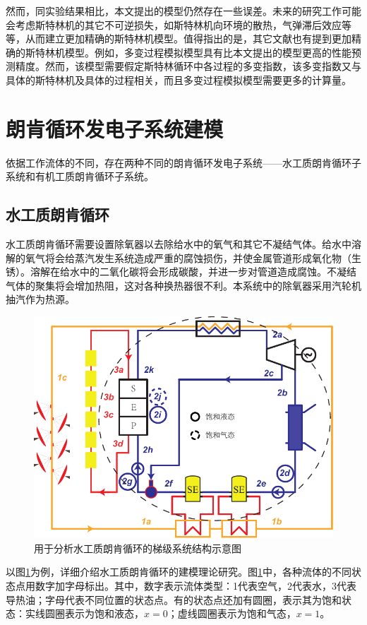 然而，同实验结果相比，本文提出的模型仍然存在一些误差。未来的研究工作可能会考虑斯特林机的其它不可逆损失，如斯特林机向环境的散热，气弹滞后效应等等，从而建立更加精确的斯特林机模型。值得指出的是，其它文献也有提到更加精确的斯特林机模型。例如，多变过程模拟模型具有比本文提出的模型更高的性能预测精度\cite{Hosseinzade2015, Babaelahi2015}。然而，该模型需要假定斯特林循环中各过程的多变指数，该多变指数又与具体的斯特林机及具体的过程相关，而且多变过程模拟模型需要更多的计算量。

\section{朗肯循环发电子系统建模}
依据工作流体的不同，存在两种不同的朗肯循环发电子系统——水工质朗肯循环子系统和有机工质朗肯循环子系统。

\subsection{水工质朗肯循环}
  
  水工质朗肯循环需要设置除氧器以去除给水中的氧气和其它不凝结气体。给水中溶解的氧气将会给蒸汽发生系统造成严重的腐蚀损伤，并使金属管道形成氧化物（生锈）。溶解在给水中的二氧化碳将会形成碳酸，并进一步对管道造成腐蚀。不凝结气体的聚集将会增加热阻，这对各种换热器很不利。本系统中的除氧器采用汽轮机抽汽作为热源。
  
\begin{figure}[!ht]
\centering
	\includegraphics[width = 0.8\columnwidth]{fig/SRCinCS}
	\caption{用于分析水工质朗肯循环的梯级系统结构示意图}
	\label{fig:SRCinCS}
\end{figure}
  
  以图\ref{fig:SRCinCS}为例，详细介绍水工质朗肯循环的建模理论研究。图\ref{fig:SRCinCS}中，各种流体的不同状态点用数字加字母标出。其中，数字表示流体类型：1代表空气，2代表水，3代表导热油；字母代表不同位置的状态点。有的状态点还加有圆圈，表示其为饱和状态：实线圆圈表示为饱和液态，$x = 0$；虚线圆圈表示为饱和气态，$x = 1$。


